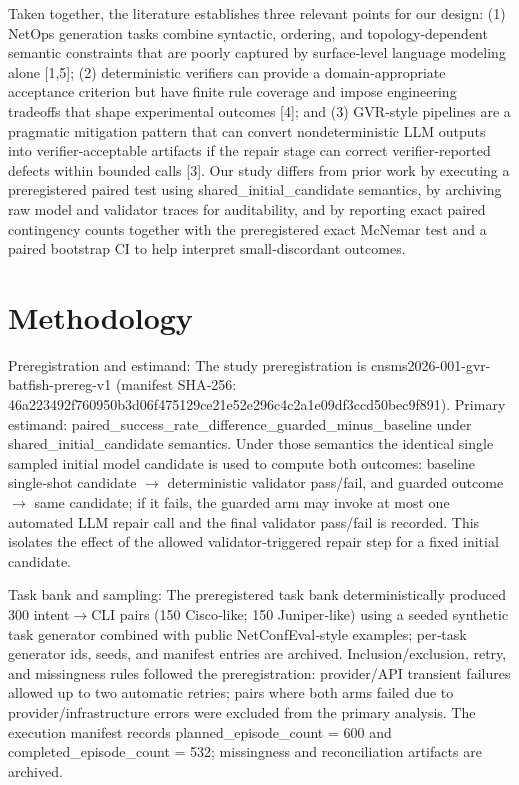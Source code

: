 \documentclass[conference]{IEEEtran}
\begin{document}
Taken together, the literature establishes three relevant points for our design: (1) NetOps generation tasks combine syntactic, ordering, and topology‑dependent semantic constraints that are poorly captured by surface‑level language modeling alone [1,5]; (2) deterministic verifiers can provide a domain‑appropriate acceptance criterion but have finite rule coverage and impose engineering tradeoffs that shape experimental outcomes [4]; and (3) GVR‑style pipelines are a pragmatic mitigation pattern that can convert nondeterministic LLM outputs into verifier‑acceptable artifacts if the repair stage can correct verifier‑reported defects within bounded calls [3]. Our study differs from prior work by executing a preregistered paired test using shared\_initial\_candidate semantics, by archiving raw model and validator traces for auditability, and by reporting exact paired contingency counts together with the preregistered exact McNemar test and a paired bootstrap CI to help interpret small‑discordant outcomes.

\section{Methodology}
Preregistration and estimand: The study preregistration is cnsms2026-001-gvr-batfish-prereg-v1 (manifest SHA‑256: 46a22349\allowbreak{}2f760950\allowbreak{}b3d06f47\allowbreak{}5129ce21\allowbreak{}e52e296c\allowbreak{}4c2a1e09\allowbreak{}df3ccd50\allowbreak{}bec9f891). Primary estimand: paired\_success\_rate\_difference\_guarded\_minus\_baseline under shared\_initial\_candidate semantics. Under those semantics the identical single sampled initial model candidate is used to compute both outcomes: baseline single‑shot candidate \ensuremath{\rightarrow} deterministic validator pass/fail, and guarded outcome \ensuremath{\rightarrow} same candidate; if it fails, the guarded arm may invoke at most one automated LLM repair call and the final validator pass/fail is recorded. This isolates the effect of the allowed validator‑triggered repair step for a fixed initial candidate.

Task bank and sampling: The preregistered task bank deterministically produced 300 intent\ensuremath{\rightarrow}CLI pairs (150 Cisco‑like; 150 Juniper‑like) using a seeded synthetic task generator combined with public NetConfEval‑style examples; per‑task generator ids, seeds, and manifest entries are archived. Inclusion/exclusion, retry, and missingness rules followed the preregistration: provider/API transient failures allowed up to two automatic retries; pairs where both arms failed due to provider/infrastructure errors were excluded from the primary analysis. The execution manifest records planned\_episode\_count = 600 and completed\_episode\_count = 532; missingness and reconciliation artifacts are archived.
\end{document}
